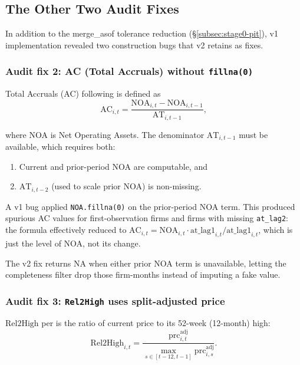 \subsection{The Other Two Audit Fixes}
\label{subsec:stage0-audit-fixes}

In addition to the merge\_asof tolerance reduction
(\S\ref{subsec:stage0-pit}), v1 implementation revealed two
construction bugs that v2 retains as fixes.

\subsubsection{Audit fix 2: AC (Total Accruals) without \texttt{fillna(0)}}

Total Accruals (AC) following \cite{RichardsonSloanSoliman2005} is
defined as
\begin{equation}
\mathrm{AC}_{i,t} = \frac{\mathrm{NOA}_{i,t} - \mathrm{NOA}_{i,t-1}}
                          {\mathrm{AT}_{i,t-1}},
\label{eq:ac-correct}
\end{equation}

where NOA is Net Operating Assets. The denominator \(\mathrm{AT}_{i,t-1}\)
must be available, which requires both:
\begin{enumerate}
\item Current and prior-period NOA are computable, and
\item \(\mathrm{AT}_{i,t-2}\) (used to scale prior NOA) is non-missing.
\end{enumerate}

A v1 bug applied \texttt{NOA.fillna(0)} on the prior-period NOA term.
This produced spurious AC values for first-observation firms and firms
with missing \texttt{at\_lag2}: the formula effectively reduced to
\(\mathrm{AC}_{i,t} = \mathrm{NOA}_{i,t} \cdot
\mathrm{at\_lag1}_{i,t} / \mathrm{at\_lag1}_{i,t}\), which is just
the level of NOA, not its change.

The v2 fix returns NA when either prior NOA term is unavailable, letting
the completeness filter drop those firm-months instead of imputing a
fake value.

\subsubsection{Audit fix 3: \texttt{Rel2High} uses split-adjusted price}

\(\mathrm{Rel2High}\) per \cite{GeorgeHwang2004} is the ratio of current
price to its 52-week (12-month) high:
\begin{equation}
\mathrm{Rel2High}_{i,t}
   = \frac{\mathrm{prc}^{\mathrm{adj}}_{i,t}}{
       \max_{s \in [t-12, t-1]} \mathrm{prc}^{\mathrm{adj}}_{i,s}}.
\label{eq:rel2high-defn}
\end{equation}

